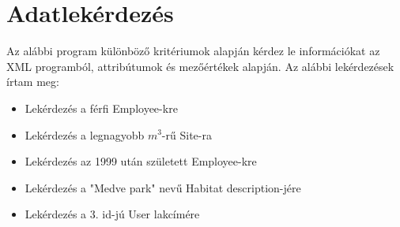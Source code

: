 \documentclass[12pt]{report}
\begin{document}
\section{Adatlekérdezés}
\indent\indent Az alábbi program különböző kritériumok alapján kérdez le információkat az XML programból, attribútumok és mezőértékek alapján. Az alábbi lekérdezések írtam meg:
\begin{itemize}
	\item Lekérdezés a férfi Employee-kre
	\item Lekérdezés a legnagyobb $m^3$-rű Site-ra
	\item Lekérdezés az 1999 után született Employee-kre
	\item Lekérdezés a "Medve park" nevű Habitat description-jére
	\item Lekérdezés a 3. id-jú User lakcímére
\end{itemize}
\end{document}
